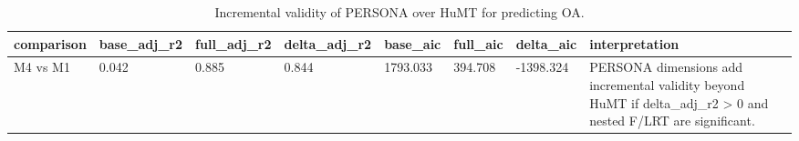 \begin{table}[t]
\centering
\caption{Incremental validity of PERSONA over HuMT for predicting OA.}
\label{tab:incremental}
\begin{tabular}{llllllll}
\toprule
comparison & base\_adj\_r2 & full\_adj\_r2 & delta\_adj\_r2 & base\_aic & full\_aic & delta\_aic & interpretation \\
\midrule
M4 vs M1 & 0.042 & 0.885 & 0.844 & 1793.033 & 394.708 & -1398.324 & PERSONA dimensions add incremental validity beyond HuMT if delta\_adj\_r2 > 0 and nested F/LRT are significant. \\
\bottomrule
\end{tabular}
\end{table}
